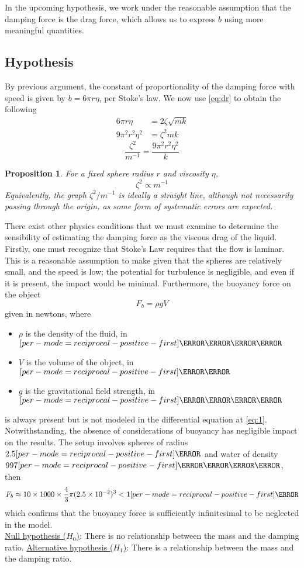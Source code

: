 \documentclass[a4paper,12pt]{article}
\newtheorem{proposition}{Proposition}
\let\oldsi\si
\renewcommand{\si}[1]{\oldsi[per-mode=reciprocal-positive-first]{#1}}
\newcommand{\lb}{\\[12pt]}
\begin{document}
In the upcoming hypothesis, we work under the reasonable assumption that the damping force is the drag force, which allows us to express $b$ using more meaningful quantities.

\pagebreak

\subsection{Hypothesis}

By previous argument, the constant of proportionality of the damping force with speed is given by $b = 6\pi r \eta$, per Stoke's law. We now use \cref{eq:dr} to obtain the following
\begin{align*}
  6\pi r \eta       & = 2\zeta \sqrt{mk} \\
  9\pi^2 r^2 \eta^2 & = \zeta^2mk
\end{align*}
\begin{equation}\label{eq:gradient}
  \frac{\zeta^2}{m^{-1}} = \frac{9\pi^2 r^2 \eta^2}{k}
\end{equation}
\begin{proposition}
  For a fixed sphere radius $r$ and viscosity $\eta$, \begin{equation}
    \zeta^2 \propto m^{-1}
  \end{equation}
  Equivalently, the graph $\zeta^2/m^{-1}$ is ideally a straight line, although not necessarily passing through the origin, as some form of systematic errors are expected.
  \label{prop:1}
\end{proposition}

There exist other physics conditions that we must examine to determine the sensibility of estimating the damping force as the viscous drag of the liquid.\lb
Firstly, one must recognize that Stoke's Law requires that the flow is laminar. This is a reasonable assumption to make given that the spheres are relatively small, and the speed is low; the potential for turbulence is negligible, and even if it is present, the impact would be minimal. Furthermore, the buoyancy force on the object
$$F_b = \rho g V$$ given in newtons, where
\begin{itemize}
  \item $\rho$ is the density of the fluid, in $\si{\kg\per\m\cubed}$
  \item $V$ is the volume of the object, in $\si{\m\cubed}$
  \item $g$ is the gravitational field strength, in $\si{\m\per\s\squared}$
\end{itemize}
is always present but is not modeled in the differential equation at \cref{eq:1}. Notwithstanding, the absence of considerations of buoyancy has negligible impact on the results. The setup involves spheres of radius $2.5\si{\cm}$ and water of density $997\si{\kg\per\m\cubed}$, then
$$F_b \approx 10 \times 1000 \times \frac{4}{3}\pi (2.5\times 10^{-2})^3 < 1\si{\N}$$
which confirms that the buoyancy force is sufficiently infinitesimal to be neglected in the model.\lb
\underline{Null hypothesis ($H_0$)}: There is no relationship between the mass and the damping ratio.
\underline{Alternative hypothesis ($H_1$)}: There is a relationship between the mass and the damping ratio.
\pagebreak
\end{document}
